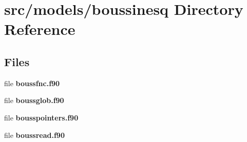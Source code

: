 \section{src/models/boussinesq Directory Reference}
\label{dir_b86ca77412377c21048d0383e26a800b}
\subsection*{Files}
\begin{DoxyCompactItemize}
\item 
file {\bf boussfnc.\+f90}
\item 
file {\bf boussglob.\+f90}
\item 
file {\bf bousspointers.\+f90}
\item 
file {\bf boussread.\+f90}
\end{DoxyCompactItemize}

